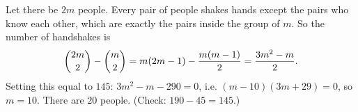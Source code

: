 Let there be $2m$ people. Every pair of people shakes hands except the pairs who know each other, which are exactly the pairs inside the group of $m$. So the number of handshakes is
\[\dbinom{2m}{2}-\dbinom m2=m(2m-1)-\dfrac{m(m-1)}{2}=\dfrac{3m^2-m}{2}.\]
Setting this equal to $145$: $3m^2-m-290=0$, i.e. $(m-10)(3m+29)=0$, so $m=10$. There are $\boxed{20}$ people. (Check: $190-45=145$.)
